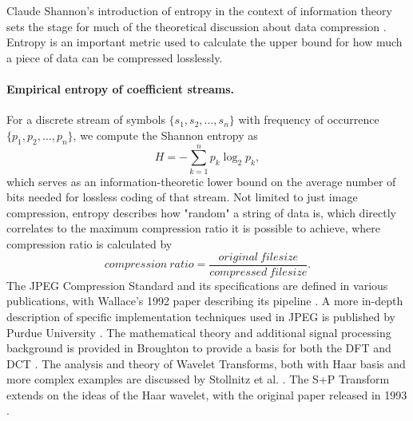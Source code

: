 Claude Shannon's introduction of entropy in the context of information theory sets the stage for much of the theoretical discussion about data compression \cite{shannon}. Entropy is an important metric used to calculate the upper bound for how much a piece of data can be compressed losslessly. 

\paragraph{Empirical entropy of coefficient streams.}
For a discrete stream of symbols $\{s_1,s_2,\dots,s_n\}$ with frequency of occurrence $\{p_1,p_2,\dots,p_n\}$, we compute
the Shannon entropy as
\begin{equation}
    H = -\sum_{k=1}^n p_k \log_2 p_k,\label{eq:entropy}
\end{equation}
which serves as an information-theoretic lower bound on the average number of
bits needed for lossless coding of that stream. Not limited to just image compression, entropy describes how "random" a string of data is, which directly correlates to the maximum compression ratio it is possible to achieve, where compression ratio is calculated by
\begin{equation}
compression\:ratio = \frac{original\:filesize}{compressed\:filesize}\label{eq:cr}.
\end{equation}
The JPEG Compression Standard and its specifications are defined in various publications, with Wallace's 1992 paper describing its pipeline \cite{wallace_jpeg_1992}. A more in-depth description of specific implementation techniques used in JPEG is published by Purdue University \cite{BoumanJPEGLab}. The mathematical theory and additional signal processing background is provided in Broughton to provide a basis for both the DFT and DCT \cite{broughton2009discrete}. The analysis and theory of Wavelet Transforms, both with Haar basis and more complex examples are discussed by Stollnitz et al. \cite{stollnitz_wavelet_1} \cite{stollnitz_wavelet_2}. The S+P Transform extends on the ideas of the Haar wavelet, with the original paper released in 1993 \cite{said1993sp}.